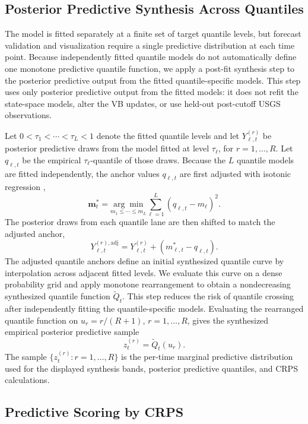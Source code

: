 \documentclass[APA,STIX1COL]{WileyNJD-v2}
\begin{document}
\subsection{Posterior Predictive Synthesis Across Quantiles}
\label{subsec:quantilesynthesis}

The model is fitted separately at a finite set of target quantile levels, but forecast validation and visualization require a single predictive distribution at each time point. Because independently fitted quantile models do not automatically define one monotone predictive quantile function, we apply a post-fit synthesis step to the posterior predictive output from the fitted quantile-specific models. This step uses only posterior predictive output from the fitted models: it does not refit the state-space models, alter the VB updates, or use held-out post-cutoff USGS observations.

Let \(0<\tau_1<\cdots<\tau_L<1\) denote the fitted quantile levels and let \(Y_{\ell,t}^{(r)}\) be posterior predictive draws from the model fitted at level \(\tau_\ell\), for \(r=1,\ldots,R\). Let \(q_{\ell,t}\) be the empirical \(\tau_\ell\)-quantile of those draws. Because the \(L\) quantile models are fitted independently, the anchor values \(q_{\ell,t}\) are first adjusted with isotonic regression \citep{barlow1972},
\[
\mathbf{m}_t^*
= \underset{m_1 \leq \cdots \leq m_L}{\arg\min}
\sum_{\ell=1}^L (q_{\ell,t}-m_\ell)^2 .
\]
The posterior draws from each quantile lane are then shifted to match the adjusted anchor,
\[
Y_{\ell,t}^{(r),\mathrm{adj}}
= Y_{\ell,t}^{(r)} + (m_{\ell,t}^* - q_{\ell,t}).
\]
The adjusted quantile anchors define an initial synthesized quantile curve by interpolation across adjacent fitted levels. We evaluate this curve on a dense probability grid and apply monotone rearrangement \citep{chernozhukov2010} to obtain a nondecreasing synthesized quantile function \(\widetilde Q_t\). This step reduces the risk of quantile crossing after independently fitting the quantile-specific models. Evaluating the rearranged quantile function on \(u_r=r/(R+1)\), \(r=1,\ldots,R\), gives the synthesized empirical posterior predictive sample
\[
z_t^{(r)}=\widetilde Q_t(u_r).
\]
The sample \(\{z_t^{(r)}:r=1,\ldots,R\}\) is the per-time marginal predictive distribution used for the displayed synthesis bands, posterior predictive quantiles, and CRPS calculations.

\subsection{Predictive Scoring by CRPS}
\label{subsec:modelselection}
\end{document}
